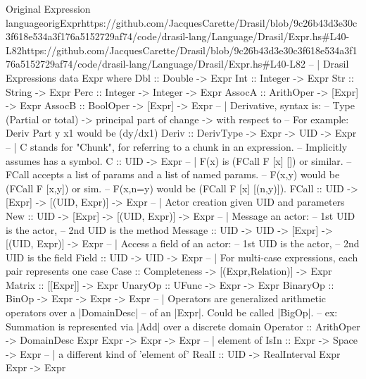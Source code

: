 \begin{haskell}{Original Expression language}{origExpr}{https://github.com/JacquesCarette/Drasil/blob/9c26b43d3e30c3f618e534a3f176a5152729a\newline{}f74/code/drasil-lang/Language/Drasil/Expr.hs\#L40-L82}{https://github.com/JacquesCarette/Drasil/blob/9c26b43d3e30c3f618e534a3f176a5152729af74/code/drasil-lang/Language/Drasil/Expr.hs\#L40-L82}
-- | Drasil Expressions
data Expr where
  Dbl      :: Double -> Expr
  Int      :: Integer -> Expr
  Str      :: String -> Expr
  Perc     :: Integer -> Integer -> Expr
  AssocA   :: ArithOper -> [Expr] -> Expr
  AssocB   :: BoolOper  -> [Expr] -> Expr
  -- | Derivative, syntax is:
  --   Type (Partial or total) -> principal part of change -> with respect to
  --   For example: Deriv Part y x1 would be (dy/dx1)
  Deriv    :: DerivType -> Expr -> UID -> Expr
  -- | C stands for "Chunk", for referring to a chunk in an expression.
  --   Implicitly assumes has a symbol.
  C        :: UID -> Expr
  -- | F(x) is (FCall F [x] []) or similar.
  --   FCall accepts a list of params and a list of named params.
  --   F(x,y) would be (FCall F [x,y]) or sim.
  --   F(x,n=y) would be (FCall F [x] [(n,y)]).
  FCall    :: UID -> [Expr] -> [(UID, Expr)] -> Expr
  -- | Actor creation given UID and parameters 
  New      :: UID -> [Expr] -> [(UID, Expr)] -> Expr 
  -- | Message an actor: 
  --   1st UID is the actor, 
  --   2nd UID is the method
  Message  :: UID -> UID -> [Expr] -> [(UID, Expr)] -> Expr
  -- | Access a field of an actor:
  --   1st UID is the actor,
  --   2nd UID is the field
  Field :: UID -> UID -> Expr
  -- | For multi-case expressions, each pair represents one case
  Case     :: Completeness -> [(Expr,Relation)] -> Expr
  Matrix   :: [[Expr]] -> Expr
  UnaryOp  :: UFunc -> Expr -> Expr
  BinaryOp :: BinOp -> Expr -> Expr -> Expr
  -- | Operators are generalized arithmetic operators over a |DomainDesc|
  --   of an |Expr|.  Could be called |BigOp|.
  --   ex: Summation is represented via |Add| over a discrete domain
  Operator :: ArithOper -> DomainDesc Expr Expr -> Expr -> Expr
  -- | element of
  IsIn     :: Expr -> Space -> Expr 
  -- | a different kind of 'element of'
  RealI    :: UID -> RealInterval Expr Expr -> Expr 
\end{haskell}
